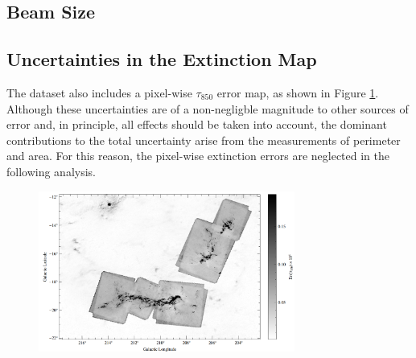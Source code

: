 \subsection{Beam Size}

\subsection{Uncertainties in the Extinction Map}

The dataset also includes a pixel-wise $\tau_{850}$ error map, as shown in Figure \ref{fig:error_map}. 
Although these uncertainties are of a non-negligble magnitude to other sources of error and, in principle, all effects should be taken into account, the dominant contributions to the total uncertainty arise from the measurements of perimeter and area. 
For this reason, the pixel-wise extinction errors are neglected in the following analysis.

\begin{figure}[t]
    \centering
    \includegraphics[width=0.75\textwidth]{figures/error_map.png}
    \caption{}
    \label{fig:error_map}
\end{figure}